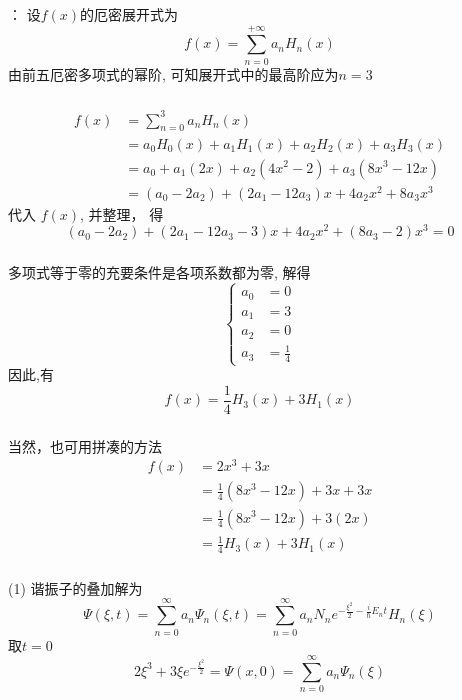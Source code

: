 \begin{frame}
	\frametitle{ }
\解：
设$f(x)$的厄密展开式为
\[ f(x) = \sum_{n=0}^{+\infty} a_n H_n(x) \] 
由前五厄密多项式的幂阶, 可知展开式中的最高阶应为$n=3$
\end{frame}

\begin{frame}
	\frametitle{ }
	\[
\begin{aligned}
	f(x) & = \sum_{n=0}^{3} a_n H_n(x) \\ 
	&= a_0 H_0(x) + a_1 H_1(x) + a_2 H_2(x) +  a_3 H_3(x) \\
	&= a_0 + a_1 (2x) + a_2 (4x^2 -2)  + a_3 (8x^3 -12x) \\
	&= (a_0 -2 a_2) + (2 a_1 - 12a_3 )x +  4 a_2 x^2 + 8a_3 x^3 
\end{aligned}
\]
代入 $f(x)$, 并整理， 得
\[ (a_0 -2 a_2) + (2 a_1 - 12a_3 -3)x +  4 a_2 x^2 + (8a_3 -2) x^3 = 0 \]
\end{frame}

\begin{frame}
	\frametitle{ }
	多项式等于零的充要条件是各项系数都为零, 解得
\[\left\{
\begin{aligned}
	a_0 &= 0\\ 
	a_1 &= 3\\
	a_2 &= 0\\
	a_3 &= \frac{1}{4}
\end{aligned} \right.
\]
因此,有 
\[ f(x) =   \frac{1}{4} H_3(x)+ 3 H_1(x)\] 
\end{frame}

\begin{frame}[label=current]
  \frametitle{}
当然，也可用拼凑的方法
\[
  \begin{aligned}
    f(x) &= 2x^3 +3x \\
    &= \frac{1}{4}(8x^3 -12x)+ 3x +3x \\
    &= \frac{1}{4}(8x^3 -12x)+ 3(2x) \\
    &= \frac{1}{4} H_3(x) + 3H_1(x)
  \end{aligned}
  \]
\end{frame} 


\begin{frame}
    \frametitle{}
    \vspace{0.3em}
  \解 (1) 谐振子的叠加解为 
	 \[\Psi (\xi,t) = \sum_{n=0} ^{\infty} a_n \Psi_n(\xi,t) = \sum_{n=0} ^{\infty} a_n N_n e^{-\frac{ \xi ^2}{2} -\frac{i}{\hbar} E_n t } H_n( \xi ) \]
	 取$t=0$
	 \[2\xi^3 +3 \xi e^{-\frac{ \xi^2}{2}} = \Psi(x, 0) = \sum_{n=0} ^{\infty} a_n \Psi_n(\xi) \]
\end{frame} 

